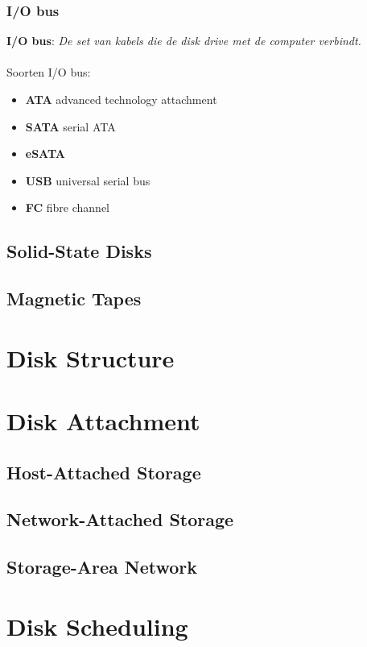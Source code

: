 \documentclass[12pt]{article}
\newcommand{\definition}[2]{\textbf{#1}: \textit{#2}}
\begin{document}
\subsubsection{I/O bus}
\definition{I/O bus}{De set van kabels die de disk drive met de computer verbindt.}
\\ \\
Soorten I/O bus:
\begin{itemize}
	\item \textbf{ATA} advanced technology attachment
	\item \textbf{SATA} serial ATA
	\item \textbf{eSATA}
	\item \textbf{USB} universal serial bus
	\item \textbf{FC} fibre channel
\end{itemize}


\subsection{Solid-State Disks}
\subsection{Magnetic Tapes}
\section{Disk Structure}
\section{Disk Attachment}
\subsection{Host-Attached Storage}
\subsection{Network-Attached Storage}
\subsection{Storage-Area Network}
\section{Disk Scheduling}
\end{document}
